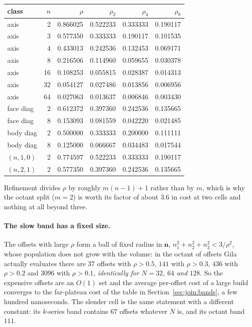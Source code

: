 \begin{center}\footnotesize
\begin{tabular}{@{}lrrrrr@{}}
\toprule
class & $n$ & $\rho$ & $\rho_2$ & $\rho_4$ & $\rho_8$\\
\midrule
axis & 2 & 0.866025 & 0.522233 & 0.333333 & 0.190117\\
axis & 3 & 0.577350 & 0.333333 & 0.190117 & 0.101535\\
axis & 4 & 0.433013 & 0.242536 & 0.132453 & 0.069171\\
axis & 8 & 0.216506 & 0.114960 & 0.059655 & 0.030378\\
axis & 16 & 0.108253 & 0.055815 & 0.028387 & 0.014313\\
axis & 32 & 0.054127 & 0.027486 & 0.013856 & 0.006956\\
axis & 64 & 0.027063 & 0.013637 & 0.006846 & 0.003430\\
face diag & 2 & 0.612372 & 0.397360 & 0.242536 & 0.135665\\
face diag & 8 & 0.153093 & 0.081559 & 0.042220 & 0.021485\\
body diag & 2 & 0.500000 & 0.333333 & 0.200000 & 0.111111\\
body diag & 8 & 0.125000 & 0.066667 & 0.034483 & 0.017544\\
$(n,1,0)$ & 2 & 0.774597 & 0.522233 & 0.333333 & 0.190117\\
$(n,2,1)$ & 2 & 0.577350 & 0.397360 & 0.242536 & 0.135665\\
\bottomrule
\end{tabular}
\end{center}

\noindent
Refinement divides $\rho$ by roughly $m(n-1)+1$ rather than by $m$, which is why the
octant split ($m = 2$) is worth its factor of about $3.6$ in cost at two cells and nothing
at all beyond three.

\paragraph{The slow band has a fixed size.} The offsets with large $\rho$ form a ball of
fixed radius in $\mathbf{n}$, $n_1^2+n_2^2+n_3^2 < 3/\rho^2$, whose population does not
grow with the volume: in the octant of offsets Gila actually evaluates there are $37$
offsets with $\rho > 0.5$, $141$ with $\rho > 0.3$, $436$ with $\rho > 0.2$ and $3096$
with $\rho > 0.1$, \emph{identically for $N = 32$, $64$ and $128$}. So the expensive
offsets are an $O(1)$ set and the average per-offset cost of a large build converges to
the far-plateau cost of the table in Section~\ref{sec:join:bands}, a few hundred
nanoseconds. The slender cell is the same statement with a different constant: its
$k$-series band contains $67$ offsets whatever $N$ is, and its octant band $111$.
